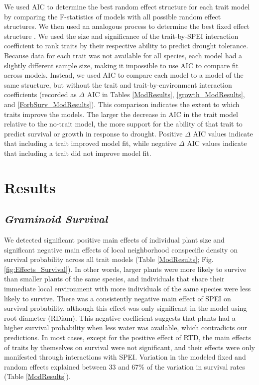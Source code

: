 \documentclass[12pt, letterpaper]{article}
\begin{document}
We used AIC to determine the best random effect structure for each trait model by comparing the F-statistics of models with all possible random effect structures. We then used an analogous process to determine the best fixed effect structure \cite{Bolker2009}. We used the size and significance of the trait-by-SPEI interaction coefficient to rank traits by their respective ability to predict drought tolerance. Because data for each trait was not available for all species, each model had a slightly different sample size, making it impossible to use AIC to compare fit across models. Instead, we used AIC to compare each model to a model of the same structure, but without the trait and trait-by-environment interaction coefficients (recorded as $\Delta$ AIC in Tables \ref{ModResults}, \ref{growth_ModResults}, and \ref{ForbSurv_ModResults}). This comparison indicates the extent to which traits improve the models. The larger the decrease in AIC in the trait model relative to the no-trait model, the more support for the ability of that trait to predict survival or growth in response to drought. Positive $\Delta$ AIC values indicate that including a trait improved model fit, while negative $\Delta$ AIC values indicate that including a trait did not improve model fit. 


\section{Results}
\subsection{\textit{Graminoid Survival}} 
We detected significant positive main effects of individual plant size and significant negative main effects of local neighborhood conspecific density on survival probability across all trait models (Table \ref{ModResults}; Fig. \ref{fig:Effects_Survival}). In other words, larger plants were more likely to survive than smaller plants of the same species, and individuals that share their immediate local environment with more individuals of the same species were less likely to survive. There was a consistently negative main effect of SPEI on survival probability, although this effect was only significant in the model using root diameter (RDiam). This negative coefficient suggests that plants had a higher survival probability when less water was available, which contradicts our predictions. In most cases, except for the positive effect of RTD, the main effects of traits by themselves on survival were not significant, and their effects were only manifested through interactions with SPEI. Variation in the modeled fixed and random effects explained between 33 and 67\% of the variation in survival rates (Table \ref{ModResults}).
\end{document}
